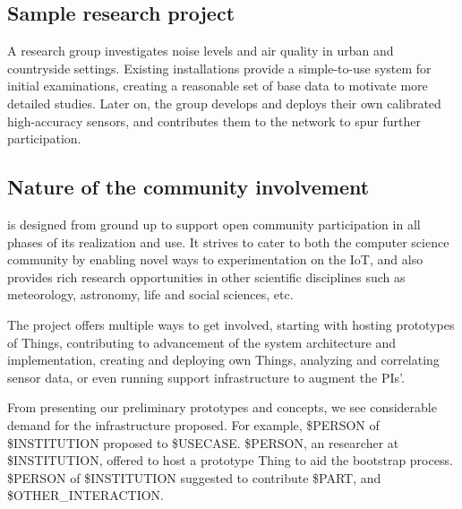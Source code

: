 \subsection{Sample research project}

A research group investigates noise levels and air quality in
urban and countryside settings. Existing \sysname installations
provide a simple-to-use system for initial examinations, creating
a reasonable set of base data to motivate more detailed studies.
Later on, the group develops and deploys their own calibrated
high-accuracy sensors, and contributes them to the \sysname network
to spur further participation.



\subsection{Nature of the community involvement}

\sysname is designed from ground up to support open community
participation in all phases of its realization and use.
It strives to cater to both the computer science community
by enabling novel ways to experimentation on the \acrlong{IoT},
and also provides rich research opportunities in other
scientific disciplines such as meteorology, astronomy, life and
social sciences, etc.

The project offers multiple ways to get involved, starting with
hosting prototypes of Things, contributing to advancement of the
system architecture and implementation, creating and deploying
own Things, analyzing and correlating sensor data, or even
running \sysname support infrastructure to augment the PIs'.

From presenting our preliminary prototypes and concepts,
we see considerable demand for the infrastructure proposed.
For example, \$PERSON of \$INSTITUTION proposed to \$USECASE.
\$PERSON, an researcher at \$INSTITUTION, offered to host
a prototype Thing to aid the bootstrap process.
\$PERSON of \$INSTITUTION suggested to contribute
\$PART, and \$OTHER\_INTERACTION.


